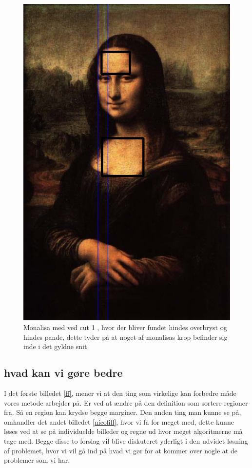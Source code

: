 \begin{figure}[h!!]
	\begin{center}
		\includegraphics[scale=0.50,angle=0]{afsnit/afprovning/billeder/BBMonalisacut1.png}
	\end{center}
	\caption[]{Monalisa med ved cut 1 , hvor der bliver fundet hindes
	overbryst og hindes pande, dette tyder på at noget af monalisas krop
	befinder sig inde i det gyldne snit}
	\label{BBMonalisacut1}
\end{figure}


\subsection{hvad kan vi gøre bedre}
I det første billedet \ref{ff}, mener vi at den ting som virkelige kan
forbedre måde vores metode arbejder på. Er ved at ændre på den
definition som sortere regioner fra. Så en region kan krydse begge
marginer. Den anden ting man kunne se på, omhandler det andet billedet
\ref{nicofill}, hvor vi få for meget med, dette kunne løses ved at se på
individuelde billeder og regne ud hvor meget algoritmerne må tage med.
Begge disse to forslag vil blive diskuteret yderligt i den udvidet
løsning af problemet, hvor vi vil gå ind på hvad vi gør for at kommer
over nogle at de problemer som vi har.
